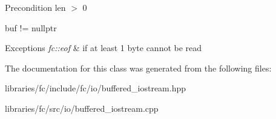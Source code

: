 \begin{DoxyPrecond}{Precondition}
len $>$ 0 

buf != nullptr 
\end{DoxyPrecond}

\begin{DoxyExceptions}{Exceptions}
{\em fc\+::eof} & if at least 1 byte cannot be read \\
\hline
\end{DoxyExceptions}


The documentation for this class was generated from the following files\+:\begin{DoxyCompactItemize}
\item 
libraries/fc/include/fc/io/buffered\+\_\+iostream.\+hpp\item 
libraries/fc/src/io/buffered\+\_\+iostream.\+cpp\end{DoxyCompactItemize}
